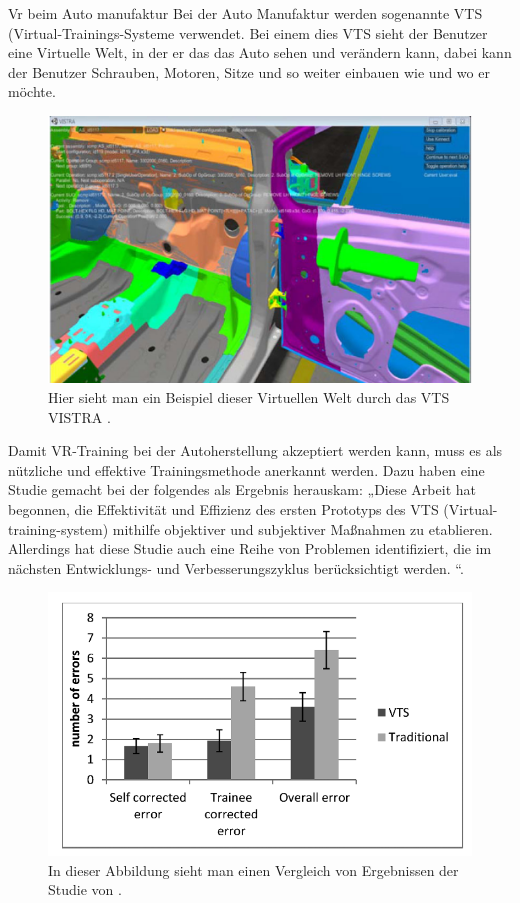 Vr beim Auto manufaktur
Bei der Auto Manufaktur werden sogenannte VTS (Virtual-Trainings-Systeme verwendet. Bei einem dies VTS sieht der Benutzer eine Virtuelle Welt, in der er das das Auto sehen und verändern kann, dabei kann der Benutzer Schrauben, Motoren, Sitze und so weiter einbauen wie und wo er möchte.
\begin{figure}[!ht]
    \centering
    \includegraphics[width=1.0\textwidth]{images/Abbildung 4.png}
    \caption{\label{fig:Abbildung 4}Hier sieht man ein Beispiel dieser Virtuellen Welt durch das VTS VISTRA \cite{langley2016establishing}.\protect
    }
\end{figure}
Damit VR-Training bei der Autoherstellung akzeptiert werden kann, muss es als nützliche und effektive Trainingsmethode anerkannt werden. Dazu haben \cite{langley2016establishing} eine Studie gemacht bei der folgendes als Ergebnis herauskam: „Diese Arbeit hat begonnen, die Effektivität und Effizienz des ersten Prototyps des VTS (Virtual-training-system) mithilfe objektiver und subjektiver Maßnahmen zu etablieren. Allerdings hat diese Studie auch eine Reihe von Problemen identifiziert, die im nächsten Entwicklungs- und Verbesserungszyklus berücksichtigt werden. \cite{langley2016establishing} “.
\begin{figure}[!ht]
    \centering
    \includegraphics[width=1.0\textwidth]{images/Abbildung 5.png}
    \caption{\label{fig:Abbildung 5}In dieser Abbildung sieht man einen Vergleich von Ergebnissen der Studie von \cite{langley2016establishing}.\protect
    }
\end{figure}

